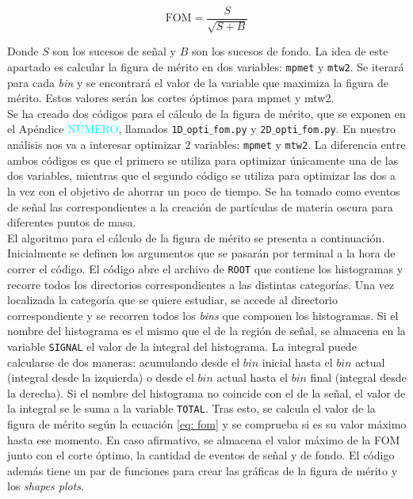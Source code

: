 \begin{equation}\label{eq: fom}
    \text{FOM} = \frac{S}{\sqrt{S+B}}
\end{equation}

Donde $S$ son los sucesos de señal y $B$ son los sucesos de fondo. La idea de este apartado es calcular la figura de mérito en dos variables: \texttt{mpmet} y \texttt{mtw2}. Se iterará para cada \textit{bin} y se encontrará el valor de la variable que maximiza la figura de mérito. Estos valores serán los cortes óptimos para mpmet y mtw2.\\


Se ha creado dos códigos para el cálculo de la figura de mérito, que se exponen en el Apéndice \textcolor{cyan}{NÚMERO}, llamados \texttt{1D$\_$opti$\_$fom.py} y \texttt{2D$\_$opti$\_$fom.py}. En nuestro análisis nos va a interesar optimizar 2 variables: \texttt{mpmet} y \texttt{mtw2}. La diferencia entre ambos códigos es que el primero se utiliza para optimizar únicamente una de las dos variables, mientras que el segundo código se utiliza para optimizar las dos a la vez con el objetivo de ahorrar un poco de tiempo. Se ha tomado como eventos de señal las correspondientes a la creación de partículas de materia oscura para diferentes puntos de masa. \\

El algoritmo para el cálculo de la figura de mérito se presenta a continuación. Inicialmente se definen los argumentos que se pasarán por terminal a la hora de correr el código. El código abre el archivo de \texttt{ROOT} que contiene los histogramas y recorre todos los directorios correspondientes a las distintas categorías. Una vez localizada la categoría que se quiere estudiar, se accede al directorio correspondiente y se recorren todos los \textit{bins} que componen los histogramas. Si el nombre del histograma es el mismo que el de la región de señal, se almacena en la variable \texttt{SIGNAL} el valor de la integral del histograma. La integral puede calcularse de dos maneras: acumulando desde el $bin$ inicial hasta el $bin$ actual (integral desde la izquierda) o desde el $bin$ actual hasta el $bin$ final (integral desde la derecha). Si el nombre del histograma no coincide con el de la señal, el valor de la integral se le suma a la variable \texttt{TOTAL}. Tras esto, se calcula el valor de la figura de mérito según la ecuación \ref{eq: fom} y se comprueba si es su valor máximo hasta ese momento. En caso afirmativo, se almacena el valor máximo de la FOM junto con el corte óptimo, la cantidad de eventos de señal y de fondo. El código además tiene un par de funciones para crear las gráficas de la figura de mérito y los \textit{shapes plots}.\\


